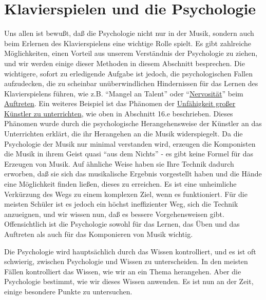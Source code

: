 
\section{Klavierspielen und die Psychologie}\hypertarget{c1iii21}{}

Uns allen ist bewußt, daß die Psychologie nicht nur in der Musik, sondern auch beim Erlernen des Klavierspielens eine wichtige Rolle spielt.
Es gibt zahlreiche Möglichkeiten, einen Vorteil aus unserem Verständnis der Psychologie zu ziehen, und wir werden einige dieser Methoden in diesem Abschnitt besprechen.
Die wichtigere, sofort zu erledigende Aufgabe ist jedoch, die psychologischen Fallen aufzudecken, die zu scheinbar unüberwindlichen Hindernissen für das Lernen des Klavierspielens führen, wie z.B. \enquote{Mangel an Talent} oder \enquote{\hyperlink{c1iii15}{Nervosität}} beim \hyperlink{c1iii14}{Auftreten}.
Ein weiteres Beispiel ist das Phänomen der \hyperlink{c1iii16e}{Unfähigkeit großer Künstler zu unterrichten}, wie oben in Abschnitt 16.e beschrieben.
Dieses Phänomen wurde durch die psychologische Herangehensweise der Künstler an das Unterrichten erklärt, die ihr Herangehen an die Musik widerspiegelt.
Da die Psychologie der Musik nur minimal verstanden wird, erzeugen die Komponisten die Musik in ihrem Geist quasi \enquote{aus dem Nichts} - es gibt keine Formel für das Erzeugen von Musik.
Auf ähnliche Weise haben sie Ihre Technik dadurch erworben, daß sie sich das musikalische Ergebnis vorgestellt haben und  die Hände eine Möglichkeit finden ließen, dieses zu erreichen.
Es ist eine unheimliche Verkürzung des Wegs zu einem komplexen Ziel, wenn es funktioniert.
Für die meisten Schüler ist es jedoch ein höchst ineffizienter Weg, sich die Technik anzueignen, und wir wissen nun, daß es bessere Vorgehensweisen gibt.
Offensichtlich ist die Psychologie sowohl für das Lernen, das Üben und das Auftreten als auch für das Komponieren von Musik wichtig.

Die Psychologie wird hauptsächlich durch das Wissen kontrolliert, und es ist oft schwierig, zwischen Psychologie und Wissen zu unterscheiden.
In den meisten Fällen kontrolliert das Wissen, wie wir an ein Thema herangehen.
Aber die Psychologie bestimmt, wie wir dieses Wissen anwenden.
Es ist nun an der Zeit, einige besondere Punkte zu untersuchen.

